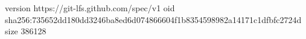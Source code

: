 version https://git-lfs.github.com/spec/v1
oid sha256:735652dd180dd3246ba8ed6d074866604f1b8354598982a14171c1dfbfc2724d
size 386128
